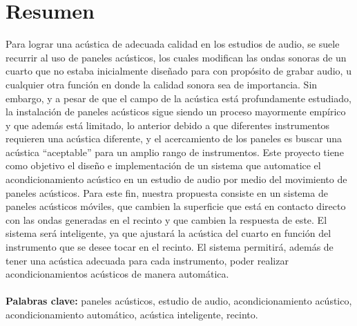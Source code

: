 \section*{Resumen}
Para lograr una acústica de adecuada calidad en los estudios de audio, se suele recurrir al uso de paneles acústicos, los cuales modifican las ondas sonoras de un cuarto que no estaba inicialmente diseñado para con propósito de grabar audio, u cualquier otra función en donde la calidad sonora sea de importancia. Sin embargo, y a pesar de que el campo de la acústica está profundamente estudiado, la instalación de paneles acústicos sigue siendo un proceso mayormente empírico y que además está limitado, lo anterior debido a que diferentes instrumentos requieren una acústica diferente, y el acercamiento de los paneles es buscar una acústica “aceptable” para un amplio rango de instrumentos. Este proyecto tiene como objetivo el diseño e implementación de un sistema que automatice el acondicionamiento acústico en un estudio de audio por medio del movimiento de paneles acústicos. Para este fin, nuestra propuesta consiste en un sistema de paneles acústicos móviles, que cambien la superficie que está en contacto directo con las ondas generadas en el recinto y que cambien la respuesta de este. El sistema será inteligente, ya que ajustará la acústica del cuarto en función del instrumento que se desee tocar en el recinto. El sistema permitirá, además de tener una acústica adecuada para cada instrumento, poder realizar acondicionamientos acústicos de manera automática.
\\
\\
\textbf{Palabras clave:} paneles acústicos, estudio de audio, acondicionamiento acústico, acondicionamiento automático, acústica inteligente, recinto.